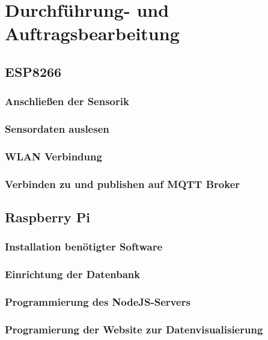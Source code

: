 \chapter{Durchführung- und Auftragsbearbeitung}
\label{cha:Durchfuehrung_und_Auftragsbearbeitung}

\section{ESP8266}
	\subsection{Anschließen der Sensorik}
	
	\subsection{Sensordaten auslesen}
	
	\subsection{WLAN Verbindung}
	
	\subsection{Verbinden zu und publishen auf MQTT Broker}
	
	
\section{Raspberry Pi}
	\subsection{Installation benötigter Software}
	
	\subsection{Einrichtung der Datenbank}
	
	\subsection{Programmierung des NodeJS-Servers}
	
	\subsection{Programierung der Website zur Datenvisualisierung}
	